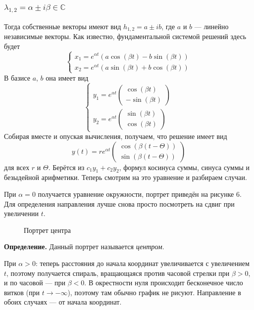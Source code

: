 \subsubsection{$\lambda_{1, 2} = \alpha \pm i \beta \in \mathbb C$}
Тогда собственные векторы имеют вид $h_{1,2} = a \pm i b$, где $a$ и $b$ --- линейно независимые векторы.
Как известно, фундаментальной системой решений здесь будет
\[
    \begin{cases}
        x_1 = e^{\alpha t}(a \cos(\beta t) - b \sin(\beta t)) \\
        x_2 = e^{\alpha t}(a \sin(\beta t) + b \cos(\beta t))
    \end{cases}
\]
В базисе $a$, $b$ она имеет вид
\[
    \begin{cases}
        y_1 = e^{\alpha t}
        \begin{pmatrix}
            \cos(\beta t) \\
            -\sin(\beta t)
        \end{pmatrix} \\

        y_2 = e^{\alpha t}
        \begin{pmatrix}
            \sin(\beta t) \\
            \cos(\beta t)
        \end{pmatrix}
    \end{cases}
\]
Собирая вместе и опуская вычисления, получаем, что решение имеет вид
\[
    y(t) = r e^{\alpha t}
    \begin{pmatrix}
        \cos(\beta (t - \Theta)) \\
        \sin(\beta (t - \Theta))
    \end{pmatrix}
\]
для всех $r$ и $\Theta$.
Берётся из $c_1 y_1 + c_2 y_2$, формул косинуса суммы, синуса суммы и безыдейной арифметики.
Теперь смотрим на это уравнение и разбираем случаи.

При $\alpha = 0$ получается уравнение окружности, портрет приведён на рисунке 6.
Для определения направления лучше снова просто посмотреть на сдвиг при увеличении $t$.

\begin{figure}[ht]
    \centering
    \caption{Портрет центра}
\end{figure}

\textbf{Определение.} Данный портрет называется \textit{центром}.

При $\alpha > 0$: теперь расстояния до начала координат увеличивается с увеличением $t$, поэтому получается спираль, вращающаяся против часовой стрелки при $\beta > 0$, и по часовой --- при $\beta < 0$.
В окрестности нуля происходит бесконечное число витков (при $t \to -\infty$), поэтому там обычно график не рисуют.
Направление в обоих случаях --- от начала координат.

